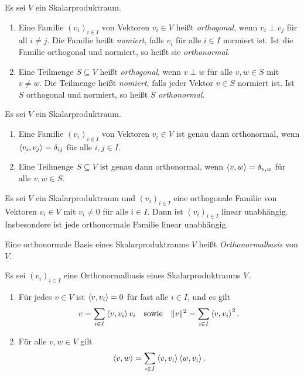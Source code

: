 \begin{definition}
  Es sei $V$ ein Skalarproduktraum.
  \begin{enumerate}[leftmargin=*, label=\roman*)]
    \item
      Eine Familie $(v_i)_{i \in I}$ von Vektoren $v_i \in V$ heißt \emph{orthogonal}, wenn $v_i \perp v_j$ für all $i \neq j$.
      Die Familie heißt \emph{nomiert}, falls $v_i$ für alle $i \in I$ normiert ist.
      Ist die Familie orthogonal und normiert, so heißt sie \emph{orthonormal}.
    \item
      Eine Teilmenge $S \subseteq V$ heißt \emph{orthogonal}, wenn $v \perp w$ für alle $v, w \in S$ mit $v \neq w$.
      Die Teilmenge heißt \emph{nomiert}, falls jeder Vektor $v \in S$ normiert ist.
      Ist $S$ orthogonal und normiert, so heißt $S$ \emph{orthonormal}.
  \end{enumerate}
\end{definition}



\begin{lemma}
  Es sei $V$ ein Skalarproduktraum.
  \begin{enumerate}[leftmargin=*]
    \item
      Eine Familie $(v_i)_{i \in I}$ von Vektoren $v_i \in V$ ist genau dann orthonormal, wenn $\left\langle v_i, v_j \right\rangle = \delta_{ij}$ für alle $i,j \in I$.
    \item
      Eine Teilmenge $S \subseteq V$ ist genau dann orthonormal, wenn $\left\langle v, w \right\rangle = \delta_{v,w}$ für alle $v, w \in S$.
  \end{enumerate}  
\end{lemma}


\begin{lemma}
  Es sei $V$ ein Skalarproduktraum und $(v_i)_{i \in I}$ eine orthogonale Familie von Vektoren $v_i \in V$ mit $v_i \neq 0$ für alle $i \in I$.
  Dann ist $(v_i)_{i \in I}$ linear unabhängig.
  Insbesondere ist jede orthonormale Familie linear unabhängig.
\end{lemma}


\begin{definition}
  Eine orthonormale Basis eines Skalarproduktraums $V$ heißt \emph{Orthonormalbasis} von $V$.
\end{definition}


\begin{proposition}
  Es sei $(v_i)_{i \in I}$ eine Orthonormalbasis eines Skalarproduktraums $V$.
  \begin{enumerate}[leftmargin=*, label=\roman*)]
    \item
      Für jedes $v \in V$ ist $\left\langle v, v_i \right\rangle = 0$ für fast alle $i \in I$, und es gilt
      \begin{gather*}
        v = \sum_{i \in I} \left\langle v, v_i \right\rangle v_i
      \quad\text{sowie}\quad
        \|v\|^2 = \sum_{i \in I} \left\langle v, v_i \right\rangle^2.
      \end{gather*}
    \item
      Für alle $v, w \in V$ gilt
      \[
        \left\langle v, w \right\rangle
        = \sum_{i \in I} \left\langle v, v_i \right\rangle \left\langle w, v_i \right\rangle.
      \]
  \end{enumerate}
\end{proposition}


